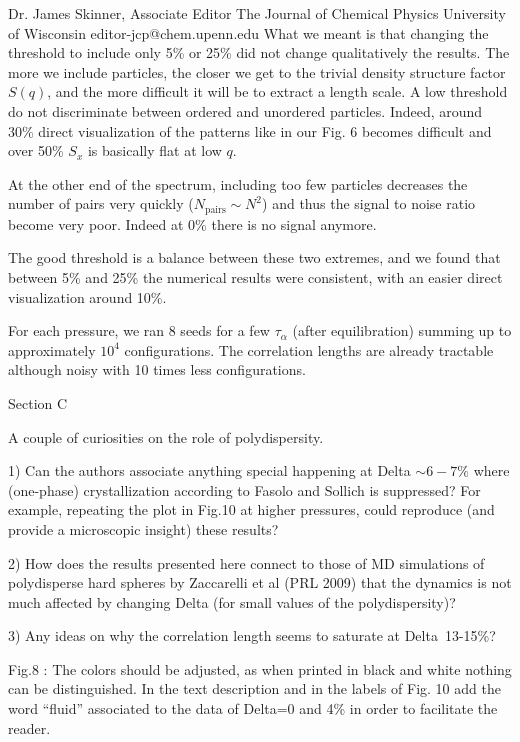 \documentclass[a4paper, rebuttal, parskip=true, firsthead=false, fromemail=true, foldmarks=false]{scrlttr2}
\begin{document}
\begin{letter}{Dr. James Skinner, Associate Editor
The Journal of Chemical Physics
University of Wisconsin
editor-jcp@chem.upenn.edu }
What we meant is that changing the threshold to include only 5\% or 25\% did not change qualitatively the results. The more we include particles, the closer we get to the trivial density structure factor $S(q)$, and the more difficult it will be to extract a length scale. A low threshold do not discriminate between ordered and unordered particles. Indeed, around 30\% direct visualization of the patterns like in our Fig. 6 becomes difficult and over 50\% $S_x$ is basically flat at low $q$. 

At the other end of the spectrum, including too few particles decreases the number of pairs very quickly ($N_\text{pairs}\sim N^2$) and thus the signal to noise ratio become very poor. Indeed at 0\% there is no signal anymore.

The good threshold is a balance between these two extremes, and we found that between 5\% and 25\% the numerical results were consistent, with an easier direct visualization around 10\%.

For each pressure, we ran 8 seeds for a few $\tau_\alpha$ (after equilibration) summing up to approximately $10^4$ configurations. The correlation lengths are already tractable although noisy with 10 times less configurations.

\begin{quotationi}
Section C

A couple of curiosities on the role of polydispersity.

1) Can the authors associate anything special happening at Delta $\sim6-7\%$ where (one-phase) crystallization according to Fasolo and Sollich is suppressed? For example, repeating the plot in Fig.10 at higher pressures, could reproduce (and provide a microscopic insight) these results?
\end{quotationi}

\begin{quotationi}
2) How does the results presented here connect to those of MD simulations of polydisperse hard spheres by Zaccarelli et al (PRL 2009) that the dynamics is not much affected by changing Delta (for small values of the polydispersity)?
\end{quotationi}

\begin{quotationi}
3) Any ideas on why the correlation length seems to saturate at Delta~13-15\%?
\end{quotationi}

\begin{quotationi}
Fig.8 : The colors should be adjusted, as when printed in black and white nothing can be distinguished.
In the text description and in the labels of Fig. 10 add the word ``fluid'' associated to the data of Delta=0 and 4\% in order to facilitate the reader.
\end{quotationi}


\end{letter}
\end{document}
